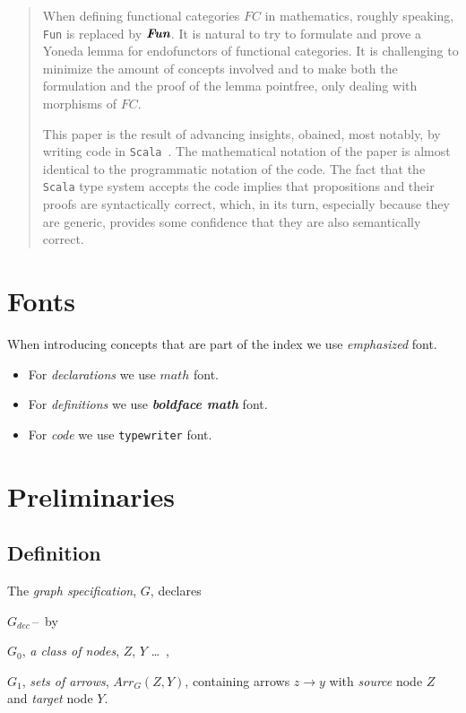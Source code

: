 \documentclass[11pt]{article}
\newcommand{\Fun}{\mbox{\bf {\em Fun}}}
\newcommand{\arrow}[2]{#1\!\!\rightarrow\!\!#2}
\newcommand{\defn}{\subsection{Definition}\begingroup\rm}
\def\edefn{\endgroup\par\pagebreak[2]\addvspace{\medskipamount}}
\newcounter{lister}
\newenvironment{labeledlist}[1]
{\begin{list}{{\rm#1\,--\,\arabic{lister}}}{\usecounter{lister}
\settowidth{\labelwidth}{#1--1}
\leftmargin\labelwidth \advance\leftmargin by \labelsep
}}
{\end{list}}
\def\blist#1{\begin{labeledlist}{#1}\setcounter{lister}{-1}}
\newcommand{\elist}{\end{labeledlist}}
\begin{document}
\begin{abstract}
\vspace{6pt}

When defining functional categories $F\!C$ in mathematics, roughly speaking, {\tt Fun} is replaced by $\Fun$. It is
natural to try to formulate and prove a Yoneda lemma for endofunctors of functional categories. It is challenging to
minimize the amount of concepts involved and to make both the formulation and the proof of the lemma pointfree, only
dealing with morphisms of $F\!C$.

\vspace{6pt}

This paper is the result of advancing insights, obained, most notably, by writing code in {\tt Scala}~\cite{book:Scala}.
The mathematical notation of the paper is almost identical to the programmatic notation of the code. The fact that the
{\tt Scala} type system accepts the code implies that propositions and their proofs are syntactically correct, which,
in its turn, especially because they are generic, provides some confidence that they are also semantically correct. 

\end{abstract}

\newpage

\section{Fonts}\label{sec:fonts}

When introducing concepts that are part of the index we use {\em emphasized} font.

\begin{itemize}
\item For {\em declarations} we use $math$ font.
\item For {\em definitions} we use {\bf {\em boldface math}} font.
\item For {\em code} we use {\tt typewriter} font.
\end{itemize}

\section{Preliminaries}\label{sec:preliminaries}

\setcounter{subsection}{0}

\defn\label{graph specification}
The {\em graph specification}, $G$, declares
\blist{$G_{dec}$}
\item $G_0$, {\em a class of nodes}, $Z$, $Y$ \ldots\, ,
\item $G_1$, {\em sets of arrows}, $Arr_{G}(Z,Y)$, containing arrows $\arrow{z}{y}$
with {\em source} node $Z$ and {\em target} node
$Y$.
\elist
\edefn
\end{document}

